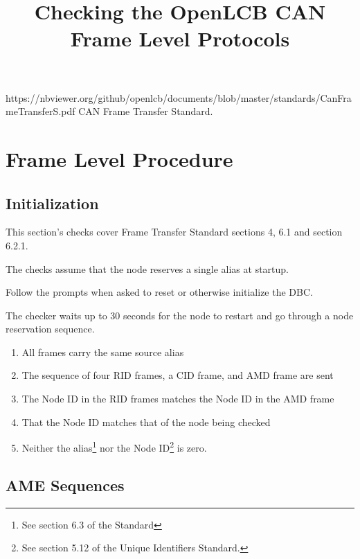 

\title{Checking the OpenLCB CAN Frame Level Protocols}


\maketitle


\introductionCaveats
    {https://nbviewer.org/github/openlcb/documents/blob/master/standards/CanFrameTransferS.pdf}
    {CAN Frame Transfer Standard}.

\section{Frame Level Procedure}


\subsection{Initialization}

This section's checks cover Frame Transfer Standard sections 4, 6.1 and section 6.2.1.

The checks assume that the node reserves a single alias at startup.

Follow the prompts when asked to reset or otherwise initialize the DBC.

The checker waits up to 30 seconds for the node to restart and 
go through a node reservation sequence.

\begin{enumerate}
\item All frames carry the same source alias
\item The sequence of four RID frames, a CID frame, and AMD frame are sent
\item The Node ID in the RID frames matches the Node ID in the AMD frame
\item That the Node ID matches that of the node being checked
\item Neither the alias\footnote{See section 6.3 of the Standard} 
nor the Node ID\footnote{See section 5.12 of the Unique Identifiers Standard.}
is zero.
\end{enumerate}


\subsection{AME Sequences}

